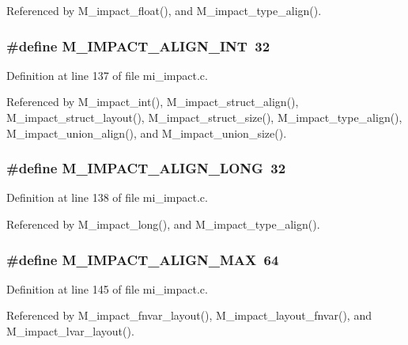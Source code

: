 Referenced by M\_\-impact\_\-float(), and M\_\-impact\_\-type\_\-align().
\subsubsection{\setlength{\rightskip}{0pt plus 5cm}\#define M\_\-IMPACT\_\-ALIGN\_\-INT~32}\label{mi__impact_8c_948130e605226cec8b8cdf3babb62bdc}




Definition at line 137 of file mi\_\-impact.c.

Referenced by M\_\-impact\_\-int(), M\_\-impact\_\-struct\_\-align(), M\_\-impact\_\-struct\_\-layout(), M\_\-impact\_\-struct\_\-size(), M\_\-impact\_\-type\_\-align(), M\_\-impact\_\-union\_\-align(), and M\_\-impact\_\-union\_\-size().
\subsubsection{\setlength{\rightskip}{0pt plus 5cm}\#define M\_\-IMPACT\_\-ALIGN\_\-LONG~32}\label{mi__impact_8c_653a3ccaba9e475f9886b35acbfdf996}




Definition at line 138 of file mi\_\-impact.c.

Referenced by M\_\-impact\_\-long(), and M\_\-impact\_\-type\_\-align().
\subsubsection{\setlength{\rightskip}{0pt plus 5cm}\#define M\_\-IMPACT\_\-ALIGN\_\-MAX~64}\label{mi__impact_8c_b061fa47f9cf8f5df0672e08b8598ee2}




Definition at line 145 of file mi\_\-impact.c.

Referenced by M\_\-impact\_\-fnvar\_\-layout(), M\_\-impact\_\-layout\_\-fnvar(), and M\_\-impact\_\-lvar\_\-layout().

